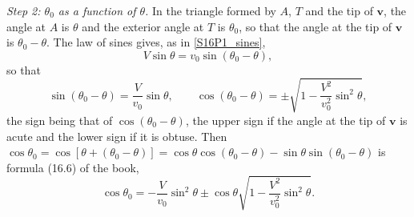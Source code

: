 \begin{problem}[title={Lab angular distribution of decay products}]
{\textit{Step 2: $\theta_0$ as a function of $\theta$.} In the triangle formed by $A$, $T$ and the tip of $\mathbf{v}$, the angle at $A$ is $\theta$ and the exterior angle at $T$ is $\theta_0$, so that the angle at the tip of $\mathbf{v}$ is $\theta_0-\theta$. The law of sines gives, as in \eqref{S16P1_sines},
\begin{equation*}
    V\sin{\theta} = v_0\sin{(\theta_0-\theta)},
\end{equation*}
so that
\begin{equation*}
    \sin{(\theta_0-\theta)} = \frac{V}{v_0}\sin{\theta}, \qquad \cos{(\theta_0-\theta)} = \pm\sqrt{1-\frac{V^2}{v_0^2}\sin^2{\theta}},
\end{equation*}
the sign being that of $\cos{(\theta_0-\theta)}$, \ie the upper sign if the angle at the tip of $\mathbf{v}$ is acute and the lower sign if it is obtuse. Then $\cos{\theta_0} = \cos{[\theta+(\theta_0-\theta)]} = \cos{\theta}\cos{(\theta_0-\theta)} - \sin{\theta}\sin{(\theta_0-\theta)}$ is formula (16.6) of the book,
\begin{equation}
    \cos{\theta_0} = -\frac{V}{v_0}\sin^2{\theta} \pm \cos{\theta}\sqrt{1-\frac{V^2}{v_0^2}\sin^2{\theta}}. \label{S16P2_cos}
\end{equation}

}
\end{problem}
